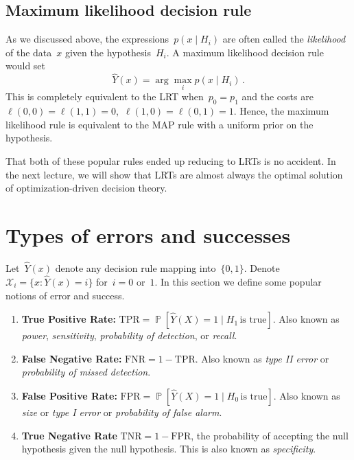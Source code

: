 \documentclass{tufte-book}
\begin{document}
\hypertarget{maximum-likelihood-decision-rule}{%
\subsection{Maximum likelihood decision
rule}\label{maximum-likelihood-decision-rule}}

As we discussed above, the expressions~\(p(x\mid H_i)\) are often called
the \emph{likelihood} of the data~\(x\) given the hypothesis~\(H_i\). A
maximum likelihood decision rule would set \[
    \hat{Y}(x) = \arg \max_i p(x\mid H_i)\,.
\] This is completely equivalent to the LRT when~\(p_0=p_1\) and the
costs are~\(\ell(0,0)=\ell(1,1)=0\),~\(\ell(1,0)=\ell(0,1)=1\). Hence,
the maximum likelihood rule is equivalent to the MAP rule with a uniform
prior on the hypothesis.

That both of these popular rules ended up reducing to LRTs is no
accident. In the next lecture, we will show that LRTs are almost always
the optimal solution of optimization-driven decision theory.

\hypertarget{types-of-errors-and-successes}{%
\section{Types of errors and
successes}\label{types-of-errors-and-successes}}

Let~\(\hat{Y}(x)\) denote any decision rule mapping into~\(\{0,1\}\).
Denote \(\mathcal{X}_i = \{x\colon\hat{Y}(x)=i\}\) for~\(i = 0\)
or~\(1\). In this section we define some popular notions of error and
success.

\begin{enumerate}
\def\labelenumi{\arabic{enumi}.}
\tightlist
\item
  \textbf{True Positive Rate:}
  \(\mathrm{TPR} = \mathop\mathbb{P}[\hat{Y}(X)=1\mid H_1\,\text{is true}]\).
  Also known as \emph{power}, \emph{sensitivity}, \emph{probability of
  detection}, or \emph{recall}.
\item
  \textbf{False Negative Rate:} \(\mathrm{FNR} = 1-\mathrm{TPR}\). Also
  known as \emph{type II error} or \emph{probability of missed
  detection}.
\item
  \textbf{False Positive Rate:}
  \(\mathrm{FPR} = \mathop\mathbb{P}[\hat{Y}(X)=1\mid H_0\,\text{is true}]\).
  Also known as \emph{size} or \emph{type I error} or \emph{probability
  of false alarm}.
\item
  \textbf{True Negative Rate} \(\mathrm{TNR}=1-\mathrm{FPR}\), the
  probability of accepting the null hypothesis given the null
  hypothesis. This is also known as
  \emph{specificity}.
\end{enumerate}
\end{document}
